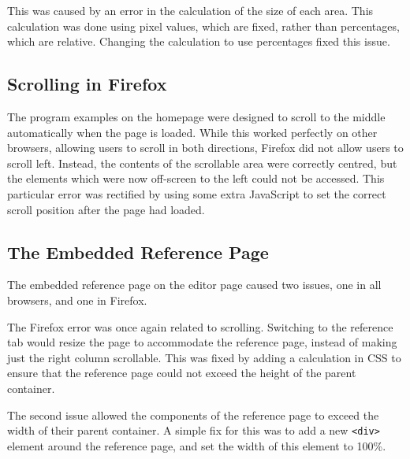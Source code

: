 \documentclass[../main.tex]{subfiles}
\begin{document}
            This was caused by an error in the calculation of the size of each area.
            This calculation was done using pixel values, which are fixed, rather than
                percentages, which are relative.
            Changing the calculation to use percentages fixed this issue.

        \subsection{Scrolling in Firefox}
            The program examples on the homepage were designed to scroll to the middle
                automatically when the page is loaded.
            While this worked perfectly on other browsers, allowing users to scroll in both
                directions, Firefox did not allow users to scroll left.
            Instead, the contents of the scrollable area were correctly centred, but the
                elements which were now off-screen to the left could not be accessed.
            This particular error was rectified by using some extra JavaScript to set the
                correct scroll position after the page had loaded.

        \subsection{The Embedded Reference Page}
            The embedded reference page on the editor page caused two issues, one in all
                browsers, and one in Firefox.

            The Firefox error was once again related to scrolling.
            Switching to the reference tab would resize the page to accommodate the
                reference page, instead of making just the right column scrollable.
            This was fixed by adding a calculation in CSS to ensure that the reference page
                could not exceed the height of the parent container.

            The second issue allowed the components of the reference page to exceed the
                width of their parent container.
            A simple fix for this was to add a new \texttt{<div>} element around the
                reference page, and set the width of this element to 100\%.
\end{document}
